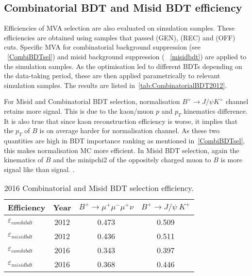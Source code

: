 \subsection{Combinatorial BDT and Misid BDT efficiency}
 Efficiencies of MVA selection are also evaluated on simulation samples. These efficiencies are obtained using samples that passed (GEN), (REC) and (OFF) cuts. Specific MVA for combinatorial background suppression (see ~\autoref{CombiBDTsel}) and misid background suppression ( ~\autoref{misidbdt}) are applied to the simulation samples. As the optimisation led to different BDTs depending on the data-taking period, these are then applied parametrically to relevant simulation samples. The results are listed in~\autoref{tab:CombinatorialBDT2012}.

For Misid and Combinatorial BDT selection, normalisation $B^{+} \rightarrow J/\psi K^{+}$ channel retains more signal. This is due to the kaon/muon $p$ and $p_{T}$ kinematics difference. It is also true that since kaon reconstruction efficiency is worse, it implies that the $p_{T}$ of $B$ is on average harder for normalisation channel. As these two quantities are high in BDT importance ranking as mentioned in~\autoref{CombiBDTsel}, this makes normalisation MC more efficient. In Misid BDT selection, again the kinematics of $B$ and the \gls{minipchi2} of the oppositely charged muon to $B$ is more signal like than signal. .

\begin{table}[H]
\begin{center}
\begin{tabular}{ l c  c  c }
Efficiency & Year & $B^{+} \rightarrow \mu^{+} \mu^{-} \mu^{+} \nu$  &  $B^{+} \rightarrow J/\psi\ K^{+}$ \\
\hline
$\varepsilon_{combibdt}$& 2012 &0.473 & 0.509 \\
$\varepsilon_{misidbdt}$& 2012 &0.436 & 0.511 \\
\hline
$\varepsilon_{combibdt}$& 2016 &0.343 & 0.397 \\
$\varepsilon_{misidbdt}$& 2016 &0.368 & 0.446 \\	
\hline
\end{tabular}
\end{center}
\caption{2016 Combinatorial and Misid BDT selection efficiency.}
\label{tab:CombinatorialBDT2012}
\end{table}





